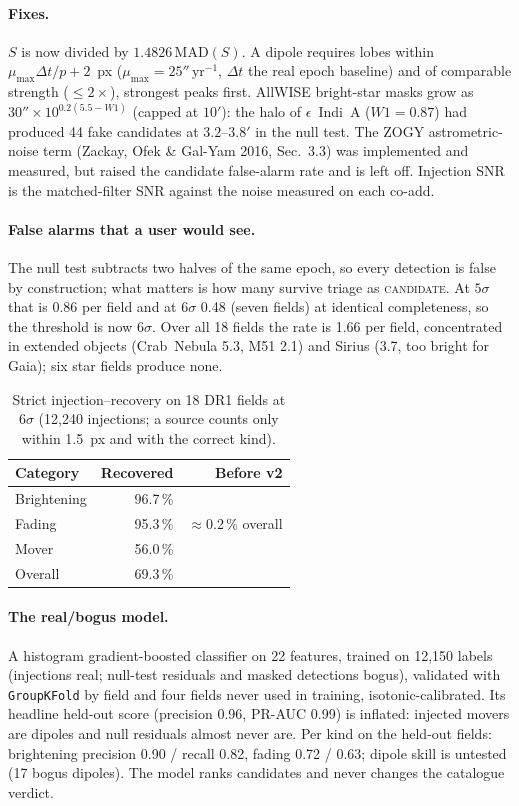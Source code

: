 \documentclass[11pt,a4paper]{article}
\begin{document}
\paragraph{Fixes.} $S$ is now divided by $1.4826\,\mathrm{MAD}(S)$. A dipole requires lobes within
$\mu_{\max}\Delta t/p + 2$~px ($\mu_{\max}=25''\,\mathrm{yr}^{-1}$, $\Delta t$ the real epoch
baseline) and of comparable strength ($\le2\times$), strongest peaks first. AllWISE bright-star masks
grow as $30''\times10^{0.2(5.5-W1)}$ (capped at $10'$): the halo of $\epsilon$~Indi~A ($W1=0.87$)
had produced 44 fake candidates at $3.2$--$3.8'$ in the null test. The ZOGY astrometric-noise term
(Zackay, Ofek \& Gal-Yam 2016, Sec.~3.3) was implemented and measured, but raised the candidate false-alarm
rate and is left off. Injection SNR is the matched-filter SNR against the noise measured on each
co-add.

\paragraph{False alarms that a user would see.} The null test subtracts two halves of the same
epoch, so every detection is false by construction; what matters is how many survive triage as
\textsc{candidate}. At $5\sigma$ that is 0.86 per field and at $6\sigma$ 0.48 (seven fields) at
identical completeness, so the threshold is now $6\sigma$. Over all 18 fields the rate is
1.66 per field, concentrated in extended objects (Crab~Nebula 5.3, M51 2.1) and Sirius (3.7, too
bright for Gaia); six star fields produce none.

\begin{table}[H]
\centering
\caption{Strict injection--recovery on 18 DR1 fields at $6\sigma$ (12{,}240 injections; a source
counts only within 1.5~px and with the correct kind).}
\label{tab:v2recovery}
\begin{tabular}{lrr}
\toprule
Category & Recovered & Before v2 \\
\midrule
Brightening & 96.7\,\% & \multirow{3}{*}{$\approx$0.2\,\% overall} \\
Fading      & 95.3\,\% & \\
Mover       & 56.0\,\% & \\
\midrule
Overall     & 69.3\,\% & \\
\bottomrule
\end{tabular}
\end{table}

\paragraph{The real/bogus model.} A histogram gradient-boosted classifier on 22 features, trained
on 12{,}150 labels (injections real; null-test residuals and masked detections bogus), validated with
\texttt{GroupKFold} by field and four fields never used in training, isotonic-calibrated. Its
headline held-out score (precision 0.96, PR-AUC 0.99) is inflated: injected movers are dipoles and
null residuals almost never are. Per kind on the held-out fields: brightening precision 0.90 /
recall 0.82, fading 0.72 / 0.63; dipole skill is untested (17 bogus dipoles). The model ranks
candidates and never changes the catalogue verdict.
\end{document}
